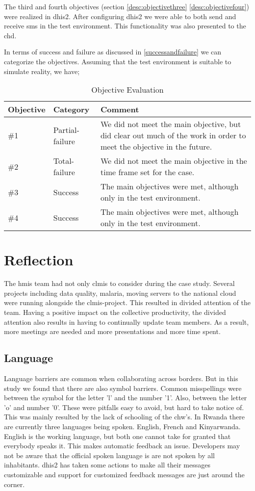 The third and fourth objectives (section \ref{desc:objectivethree} \ref{desc:objectivefour}) were realized in \gls{dhis2}. After configuring \gls{dhis2} we were able to both send and receive \gls{sms} in the test environment. This functionality was also presented to the \gls{chd}.

In terms of success and failure as discussed in \ref{successandfailure} we can categorize the objectives. Assuming that the test environment is suitable to simulate reality, we have; 
\begin{table}
\centering
\begin{tabular}{p{2cm} p{3cm} p{6cm}}
\textbf{Objective} & \textbf{Category} & \textbf{Comment} \\
\hline
\hline
\#1 
& Partial-failure 
& We did not meet the main objective, but did clear out much of the work in order to meet the objective in the future.
\\
\hline
\#2 
& Total-failure 
& We did not meet the main objective in the time frame set for the case.
\\
\hline
\#3 
& Success 
& The main objectives were met, although only in the test environment.
\\
\hline
\#4 
& Success 
& The main objectives were met, although only in the test environment.
\\
\hline
\end{tabular}
\caption{Objective Evaluation}
\label{tab:obev}
\end{table}


\section{Reflection}
The \gls{hmis} team had not only \gls{clmis} to consider during the case study.
Several projects including data quality, malaria, moving servers to the national cloud were running alongside the \gls{clmis}-project. This resulted in divided attention of the team.
Having a positive impact on the collective productivity, the divided attention also results in having to continually update team members. As a result, more meetings are needed and more presentations and more time spent. 
\subsection{Language}
Language barriers are common when collaborating across borders. But in this study we found that there are also symbol barriers.
Common misspellings were between the symbol for the letter 'l' and the number '1'.
Also, between the letter 'o' and number '0'. 
These were pitfalls easy to avoid, but hard to take notice of.
This was mainly resulted by the lack of schooling of the \gls{chw}'s. 
In Rwanda there are currently three languages being spoken. English, French and Kinyarwanda.
English is the working language, but both one cannot take for granted that everybody speaks it.
This makes automatic feedback an issue. Developers may not be aware that the official spoken language is are not spoken by all inhabitants.
\gls{dhis2} has taken some actions to make all their messages customizable and support for customized feedback messages are just around the corner.

